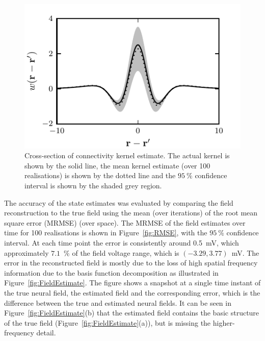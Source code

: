 \documentclass[10pt]{article}
\begin{document}
\begin{figure}
    \centering
\includegraphics{./Graph/KernelEstimate.pdf}%
\caption{Cross-section of connectivity kernel estimate. The actual kernel is shown by the solid line, the mean kernel estimate (over 100 realisations) is shown by the dotted line and the $95~\%$ confidence interval is shown by the shaded grey region.}
\label{fig:KernelEstimates}
\end{figure}
The accuracy of the state estimates was evaluated by comparing the field reconstruction to the true field using the mean (over iterations) of the root mean square error (MRMSE) (over space). The MRMSE of the field estimates over time for 100 realisations is shown in Figure~\ref{fig:RMSE}, with the $95~\%$ confidence interval. At each time point the error is consistently around 0.5~mV, which approximately $7.1$~\% of the field voltage range, which is $(-3.29,3.77)$~mV. The error in the reconstructed field is mostly due to the loss of high spatial frequency information due to the basis function decomposition as illustrated in Figure~\ref{fig:FieldEstimate}. The figure shows a snapshot at a single time instant of the true neural field, the estimated field and the corresponding error, which is the difference between the true and estimated neural fields. It can be seen in Figure~\ref{fig:FieldEstimate}(b) that the estimated field contains the basic structure of the true field (Figure~\ref{fig:FieldEstimate}(a)), but is missing the higher-frequency detail.
\end{document}
